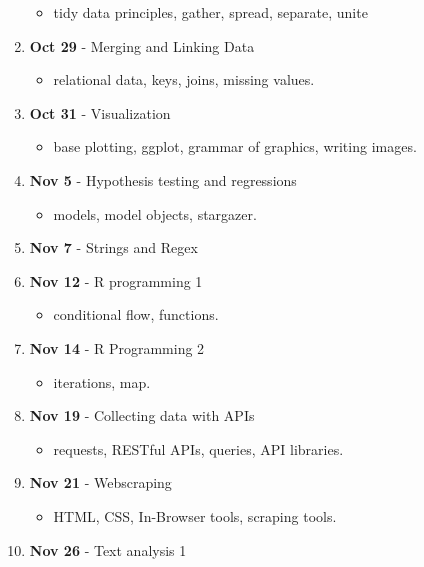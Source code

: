 \documentclass[]{book}
\providecommand{\tightlist}{%
  \setlength{\itemsep}{0pt}\setlength{\parskip}{0pt}}
\begin{document}
\begin{enumerate}
  \begin{itemize}
  \tightlist
  \item
    tidy data principles, gather, spread, separate, unite
  \end{itemize}
\item
  \textbf{Oct 29} - Merging and Linking Data

  \begin{itemize}
  \tightlist
  \item
    relational data, keys, joins, missing values.
  \end{itemize}
\item
  \textbf{Oct 31} - Visualization

  \begin{itemize}
  \tightlist
  \item
    base plotting, ggplot, grammar of graphics, writing images.
  \end{itemize}
\item
  \textbf{Nov 5} - Hypothesis testing and regressions

  \begin{itemize}
  \tightlist
  \item
    models, model objects, stargazer.
  \end{itemize}
\item
  \textbf{Nov 7} - Strings and Regex
\item
  \textbf{Nov 12} - R programming 1

  \begin{itemize}
  \tightlist
  \item
    conditional flow, functions.
  \end{itemize}
\item
  \textbf{Nov 14} - R Programming 2

  \begin{itemize}
  \tightlist
  \item
    iterations, map.
  \end{itemize}
\item
  \textbf{Nov 19} - Collecting data with APIs

  \begin{itemize}
  \tightlist
  \item
    requests, RESTful APIs, queries, API libraries.
  \end{itemize}
\item
  \textbf{Nov 21} - Webscraping

  \begin{itemize}
  \tightlist
  \item
    HTML, CSS, In-Browser tools, scraping tools.
  \end{itemize}
\item
  \textbf{Nov 26} - Text analysis 1


\end{enumerate}
\end{document}
